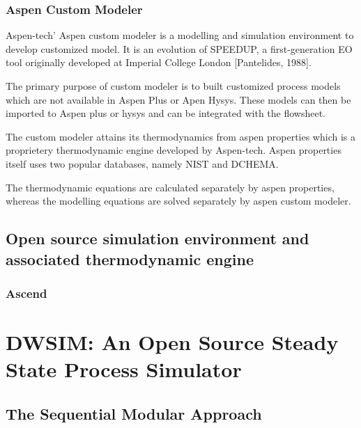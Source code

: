\documentclass[12pt]{report}
\begin{document}
\subsection{Aspen Custom Modeler}
Aspen-tech' Aspen custom modeler is a modelling and simulation environment to develop customized model. It is an evolution of SPEEDUP, a first-generation EO
tool originally developed at Imperial College London [Pantelides, 1988].

The primary purpose of custom modeler is to built customized process models which are not available in Aspen Plus or Apen Hysys. These models can then be imported to Aspen plus or hysys and can be integrated with the flowsheet. 

The custom modeler attains its thermodynamics from aspen properties which is a proprietery thermodynamic engine developed by Aspen-tech. Aspen properties itself uses two popular databases, namely NIST and DCHEMA.

The thermodynamic equations are calculated separately by aspen properties, whereas the modelling equations are solved separately by aspen custom modeler.

\section{Open source simulation environment and associated thermodynamic engine}
\subsection{Ascend}




\chapter{DWSIM: An Open Source Steady State Process Simulator}
\section{The Sequential Modular Approach}
\end{document}
